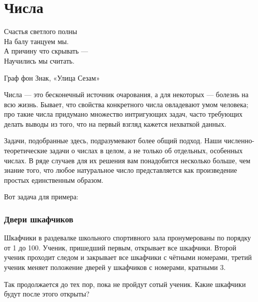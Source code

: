 \chapter*{Числа}


\epigraph{Счастья светлого полны\\ %
На балу танцуем мы.\\ %
А причину что скрывать ---\\ %
Научились мы считать.}{Граф фон Знак, «Улица Сезам»}


 




Числа --- это бесконечный источник очарования, а для некоторых --- болезнь на всю жизнь. %
Бывает, что свойства конкретного числа овладевают умом человека;
про такие числа придумано множество интригующих задач,
часто требующих делать выводы из того, что на первый взгляд кажется нехваткой данных.




Задачи, подобранные здесь, подразумевают %
более общий подход. %
Наши численно-теоретические задачи о числах в целом, а не только об отдельных, особенных числах. 
В ряде случаев для их решения вам понадобится несколько больше, чем знание того, 
что любое натуральное число представляется как произведение простых единственным образом.

\medskip

Вот задача для примера:


\subsection*{Двери шкафчиков}%

Шкафчики в раздевалке школьного спортивного зала пронумерованы по порядку от 1 до 100. Ученик, пришедший первым, открывает все шкафчики. Второй ученик проходит следом и закрывает все шкафчики с чётными номерами, третий ученик меняет положение дверей у шкафчиков с номерами, кратными 3.

Так продолжается до тех пор, пока не пройдут сотый ученик. 
Какие шкафчики будут после этого открыты?
 
